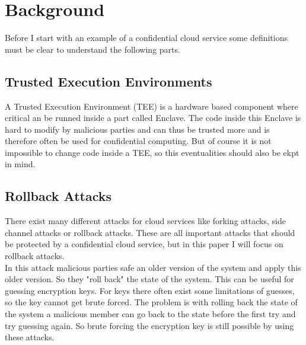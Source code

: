\section{Background}
Before I start with an example of a confidential cloud service some definitions must be clear to understand the following parts.
\subsection{Trusted Execution Environments}
A Trusted Execution Environment (TEE) is a hardware based component where critical an be runned inside a part called Enclave. The code inside this Enclave is hard to modify by malicious parties and can thus be trusted more and is therefore often be used for confidential computing.  But of course it is not impossible to change code inside a TEE, so this eventualities should also be ekpt in mind.
\subsection{Rollback Attacks}
There exist many different attacks for cloud services like forking attacks, side channel attacks or rollback attacks. These are all important attacks that should be protected by a confidential cloud service, but in this paper I will focus on rollback attacks.\\
In this attack malicious parties safe an older version of the system and apply this older version. So they "roll back" the state of the system. This can be useful for guessing encryption keys. For keys there often exist some limitations of guesses, so the key cannot get brute forced. The problem is with rolling back the state of the system a malicious member can go back to the state before the first try and try guessing again. So brute forcing the encryption key is still possible by using these attacks. 